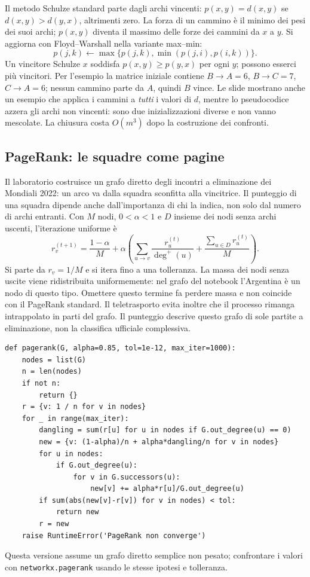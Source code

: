 Il metodo Schulze standard parte dagli archi vincenti: $p(x,y)=d(x,y)$ se $d(x,y)>d(y,x)$, altrimenti zero. La forza di un cammino è il minimo dei pesi dei suoi archi; $p(x,y)$ diventa il massimo delle forze dei cammini da $x$ a $y$. Si aggiorna con Floyd--Warshall nella variante max--min:
\[ p(j,k)\leftarrow\max\{p(j,k),\min(p(j,i),p(i,k))\}. \]
Un vincitore Schulze $x$ soddisfa $p(x,y)\ge p(y,x)$ per ogni $y$; possono esserci più vincitori. Per l'esempio la matrice iniziale contiene $B\to A=6$, $B\to C=7$, $C\to A=6$; nessun cammino parte da $A$, quindi $B$ vince. Le slide mostrano anche un esempio che applica i cammini a \emph{tutti} i valori di $d$, mentre lo pseudocodice azzera gli archi non vincenti: sono due inizializzazioni diverse e non vanno mescolate. La chiusura costa $O(m^3)$ dopo la costruzione dei confronti.

\subsection{PageRank: le squadre come pagine}
Il laboratorio costruisce un grafo diretto degli incontri a eliminazione dei Mondiali 2022: un arco va dalla squadra sconfitta alla vincitrice. Il punteggio di una squadra dipende anche dall'importanza di chi la indica, non solo dal numero di archi entranti. Con $M$ nodi, $0<\alpha<1$ e $D$ insieme dei nodi senza archi uscenti, l'iterazione uniforme è
\[ r_v^{(t+1)}=\frac{1-\alpha}{M}+\alpha\left(\sum_{u\to v}\frac{r_u^{(t)}}{\deg^+(u)}+\frac{\sum_{u\in D}r_u^{(t)}}{M}\right). \]
Si parte da $r_v=1/M$ e si itera fino a una tolleranza. La massa dei nodi senza uscite viene ridistribuita uniformemente: nel grafo del notebook l'Argentina è un nodo di questo tipo. Omettere questo termine fa perdere massa e non coincide con il PageRank standard. Il teletrasporto evita inoltre che il processo rimanga intrappolato in parti del grafo. Il punteggio descrive questo grafo di sole partite a eliminazione, non la classifica ufficiale complessiva.
\begin{lstlisting}
def pagerank(G, alpha=0.85, tol=1e-12, max_iter=1000):
    nodes = list(G)
    n = len(nodes)
    if not n:
        return {}
    r = {v: 1 / n for v in nodes}
    for _ in range(max_iter):
        dangling = sum(r[u] for u in nodes if G.out_degree(u) == 0)
        new = {v: (1-alpha)/n + alpha*dangling/n for v in nodes}
        for u in nodes:
            if G.out_degree(u):
                for v in G.successors(u):
                    new[v] += alpha*r[u]/G.out_degree(u)
        if sum(abs(new[v]-r[v]) for v in nodes) < tol:
            return new
        r = new
    raise RuntimeError('PageRank non converge')
\end{lstlisting}
Questa versione assume un grafo diretto semplice non pesato; confrontare i valori con \texttt{networkx.pagerank} usando le stesse ipotesi e tolleranza.

